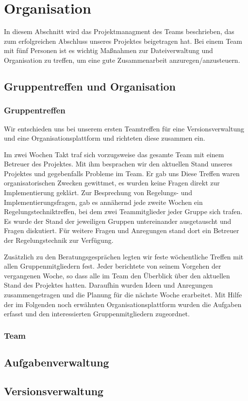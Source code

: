 \chapter{Organisation}
\label{cha:Organisation}
In diesem Abschnitt wird das Projektmanagment des Teams beschrieben, das zum erfolgreichen Abschluss unseres Projektes beigetragen hat. Bei einem Team mit fünf Personen ist es wichtig Maßnahmen zur Dateiverwaltung und Organisation zu treffen, um eine gute Zusammenarbeit anzuregen/anzusteuern.

\section{Gruppentreffen und Organisation}
\label{sec:gruppentreffenundorganisation}
\subsection*{Gruppentreffen}
Wir entschieden uns bei unserem ersten Teamtreffen für eine Versionsverwaltung und eine Organisationsplattform und richteten diese zusammen ein.

Im zwei Wochen Takt traf sich vorzugsweise das gesamte Team mit einem Betreuer des Projektes. Mit ihm besprachen wir den aktuellen Stand unseres Projektes und gegebenfalls Probleme im Team. Er gab uns Diese Treffen waren organisatorischen Zwecken gewittmet, es wurden keine Fragen direkt zur Implementierung geklärt. Zur Besprechung von Regelungs- und Implementierungsfragen, gab es annähernd jede zweite Wochen ein Regelungstechniktreffen, bei dem zwei Teammitglieder jeder Gruppe sich trafen. Es wurde der Stand der jeweiligen Gruppen untereinander ausgetauscht und Fragen diskutiert. Für weitere Fragen und Anregungen stand dort ein Betreuer der Regelungstechnik zur Verfügung.

Zusätzlich zu den Beratungsgesprächen legten wir feste wöchentliche Treffen mit allen Gruppenmitgliedern fest. Jeder berichtete von seinem Vorgehen der vergangenen Woche, so dass alle im Team den Überblick über den aktuellen Stand des Projektes hatten. Daraufhin wurden Ideen und Anregungen zusammengetragen und die Planung für die nächste Woche erarbeitet. Mit Hilfe der im Folgenden noch erwähnten Organisationsplattform wurden die Aufgaben erfasst und den interessierten Gruppenmitgliedern zugeordnet. 

\subsection*{Team}



\section{Aufgabenverwaltung}
\label{sec:aufgabenverwaltung}


\section{Versionsverwaltung}
\label{sec:versionsverwaltung}
